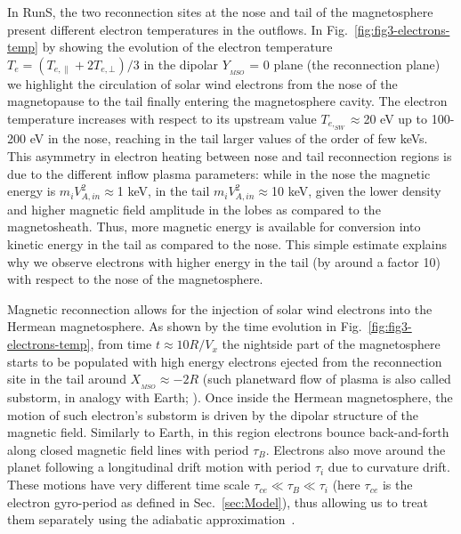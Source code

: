 \documentclass{aa}
\begin{document}
In RunS, the two reconnection sites at the nose and tail of the magnetosphere present different electron temperatures in the outflows. In Fig.~\ref{fig:fig3-electrons-temp} by showing the evolution of the electron temperature $T_e=(T_{e,\parallel}+2T_{e,\bot})/3$ in the dipolar $Y_{_{MSO}}$ = 0 plane (the reconnection plane) we highlight the circulation of solar wind electrons from the nose of the magnetopause to the tail finally entering the magnetosphere cavity. The electron temperature increases with respect to its upstream value $T_{e,_{SW}}\approx$20 eV up to 100-200 eV in the nose, reaching in the tail larger values of the order of few keVs. This asymmetry in electron heating between nose and tail reconnection regions is due to the different inflow plasma parameters: while in the nose the magnetic energy is $m_iV^2_{A,in}\approx$1 keV, in the tail $m_i V^2_{A,in}\approx$10 keV, given the lower density and higher magnetic field amplitude in the lobes as compared to the magnetosheath. Thus, more magnetic energy is available for conversion into kinetic energy in the tail as compared to the nose. This simple estimate explains why we observe electrons with higher energy in the tail (by around a factor 10) with respect to the nose of the magnetosphere.

Magnetic reconnection allows for the injection of solar wind electrons into the Hermean magnetosphere. As shown by the time evolution in Fig.~\ref{fig:fig3-electrons-temp}, from time $t\approx10 R/V_x$ the nightside part of the magnetosphere starts to be populated with high energy electrons ejected from the reconnection site in the tail around $X_{_{MSO}}\approx -2R$ (such planetward flow of plasma is also called substorm, in analogy with Earth; \citealt{Christon1987}).
Once inside the Hermean magnetosphere, the motion of such electron's substorm is driven by the dipolar structure of the magnetic field. Similarly to Earth, in this region electrons bounce back-and-forth along closed magnetic field lines with period $\tau_{B}$. Electrons also move around the planet following a longitudinal drift motion with period $\tau_{i}$ due to curvature drift. These motions have very different time scale $\tau_{ce} \ll \tau_{B} \ll \tau_{i}$ (here $\tau_{ce}$ is the electron gyro-period as defined in Sec.~\ref{sec:Model}), thus allowing us to treat them separately using the adiabatic approximation~\citep{Northrop1963}. 
\end{document}
